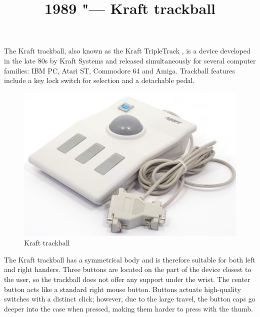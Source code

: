 \documentclass[11pt, a4paper]{article}
\begin{document}
\title{1989 "--- Kraft trackball}
\date{}
\maketitle

The Kraft trackball, also known as the Kraft TripleTrack \cite{triple}, is a device developed in the late 80s by Kraft Systems and released simultaneously for several computer families: IBM PC, Atari ST, Commodore 64 and Amiga. Trackball features include a key lock switch for selection and a detachable pedal.

\begin{figure}[h]
    \centering
    \includegraphics[scale=0.4]{1989_kraft_trackball/pic_30.jpg}
    \caption{Kraft trackball}
    \label{fig:KraftPhoto}
\end{figure}

The Kraft trackball has a symmetrical body and is therefore suitable for both left and right handers. Three buttons are located on the part of the device closest to the user, so the trackball does not offer any support under the wrist. The center button acts like a standard right mouse button. Buttons actuate high-quality switches with a distinct click; however, due to the large travel, the button caps go deeper into the case when pressed, making them harder to press with the thumb.
\end{document}
